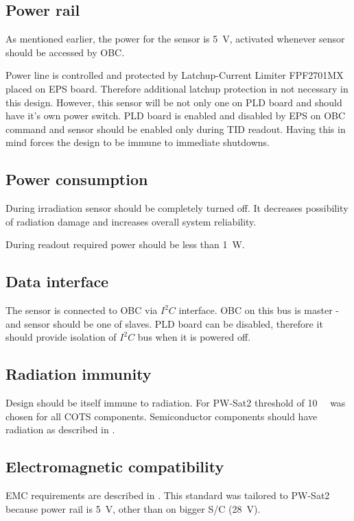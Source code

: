 \subsection{Power rail}
    As mentioned earlier, the power for the sensor is \SI{+5}{\volt}, activated whenever sensor should be accessed by OBC. 

    Power line is controlled and protected by Latchup-Current Limiter FPF2701MX placed on EPS board. Therefore additional latchup protection in not necessary in this design. However, this sensor will be not only one on PLD board and should have it's own power switch. PLD board is enabled and disabled by EPS on OBC command and sensor should be enabled only during TID readout. Having this in mind forces the design to be immune to immediate shutdowns. 

\subsection{Power consumption}
    During irradiation sensor should be completely turned off. It decreases possibility of radiation damage and increases overall system reliability.

    During readout required power should be less than \SI{1}{W}.

\subsection{Data interface}
    The sensor is connected to OBC via $I^2C$ interface. OBC on this bus is master - and sensor should be one of slaves. PLD board can be disabled, therefore it should provide isolation of $I^2C$ bus when it is powered off.

\subsection{Radiation immunity}
    Design should be itself immune to radiation. For PW-Sat2 threshold of \SI{10}{\kilo\rad} was chosen for all COTS components. Semiconductor components should have radiation as described in \cite{ESCIES_TID_test_method}.

\subsection{Electromagnetic compatibility}
    EMC requirements are described in \cite{ECSS_E_ST_20_07C}. This standard was tailored to PW-Sat2 because power rail is \SI{+5}{\volt}, other than on bigger S/C (\SI{+28}{\volt}).

